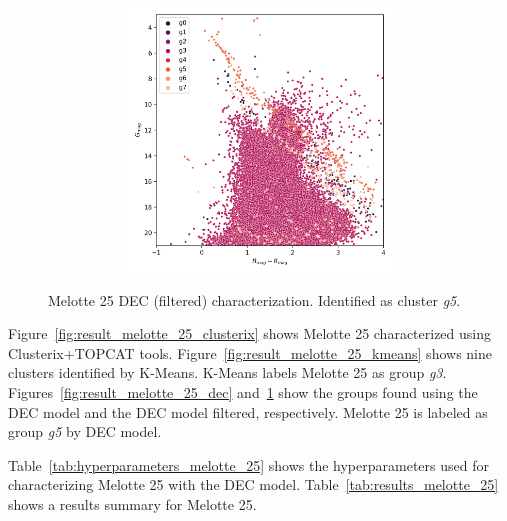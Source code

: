 \documentclass[11pt, a4paper, english]{book}
\begin{document}
\begin{figure}[H]
\begin{subfigure}{0.9\textwidth}
\begin{subfigure}[t]{0.30\textwidth}
    \end{subfigure}
    \hfill
    \begin{subfigure}[t]{0.30\textwidth}
      \centering
      \includegraphics[width=\textwidth]{../figures/melotte_25/dec_hr_diagram_filtered_melotte_25.png}
    \end{subfigure}
  \end{subfigure}
  \caption{Melotte 25 DEC (filtered) characterization. Identified as cluster \emph{g5}.}
  \label{fig:result_melotte_25_dec_filtered}
\end{figure}

\newpage

Figure~\ref{fig:result_melotte_25_clusterix} shows Melotte 25 characterized using Clusterix+TOPCAT tools.
Figure~\ref{fig:result_melotte_25_kmeans} shows nine clusters identified by K-Means.
K-Means labels Melotte 25 as group \emph{g3}.
Figures~\ref{fig:result_melotte_25_dec} and~\ref{fig:result_melotte_25_dec_filtered}
show the groups found using the DEC model and the DEC model filtered, respectively.
Melotte 25 is labeled as group \emph{g5} by DEC model.

Table~\ref{tab:hyperparameters_melotte_25} shows the hyperparameters used for characterizing Melotte 25
with the DEC model. Table~\ref{tab:results_melotte_25} shows a results summary for Melotte 25.
\end{document}

